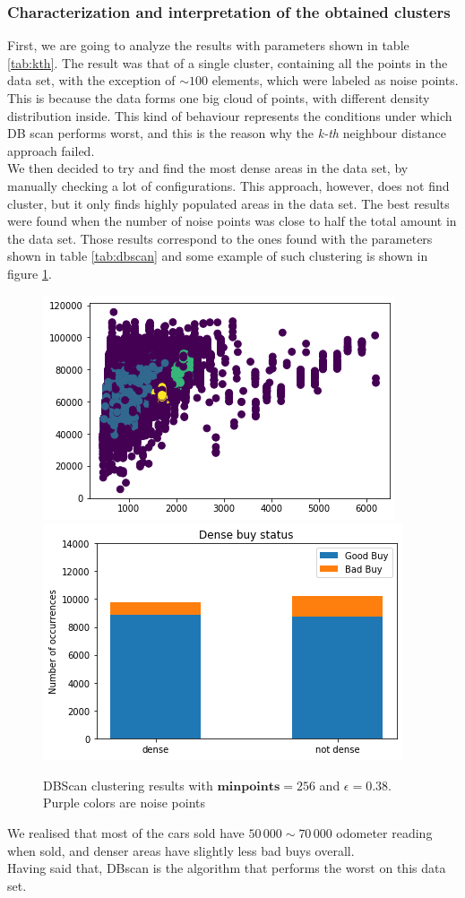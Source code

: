 \documentclass{article}
\begin{document}
	\subsubsection{Characterization and interpretation of the obtained clusters}
	\label{sec:dbscaneval}
	First, we are going to analyze the results with parameters shown in table \ref{tab:kth}. The result was that of a single cluster, containing all the points in the data set, with the exception of $\sim 100$ elements, which were labeled as noise points. This is because the data forms one big cloud of points, with different density distribution inside. This kind of behaviour represents the conditions under which DB scan performs worst, and this is the reason why the \emph{k-th} neighbour distance approach failed. \\
	We then decided to try and find the most dense areas in the data set, by manually checking a lot of configurations. This approach, however, does not find cluster, but it only finds highly populated areas in the data set. 
	The best results were found when the number of noise points was close to half the total amount in the data set. Those results correspond to the ones found with the parameters shown in table \ref{tab:dbscan} and some example of such clustering is shown in figure \ref{fig:dbscan}.
	
	\begin{figure}[H] 
		\centering
		\includegraphics[width=.40\textwidth]{cazzo}\hspace{1cm}
		\includegraphics[width=.4\textwidth]{bigboi}
		\caption{DBScan clustering results with $\mathbf{minpoints} = 256$ and $\epsilon = 0.38$. Purple colors are noise points}
		\label{fig:dbscan}
	\end{figure}
	
	We realised that most of the cars sold have $50\,000 \sim 70\,000$ odometer reading when sold, and denser areas have slightly less bad buys overall. \\
	Having said that, DBscan is the algorithm that performs the worst on this data set.
	
\end{document}
